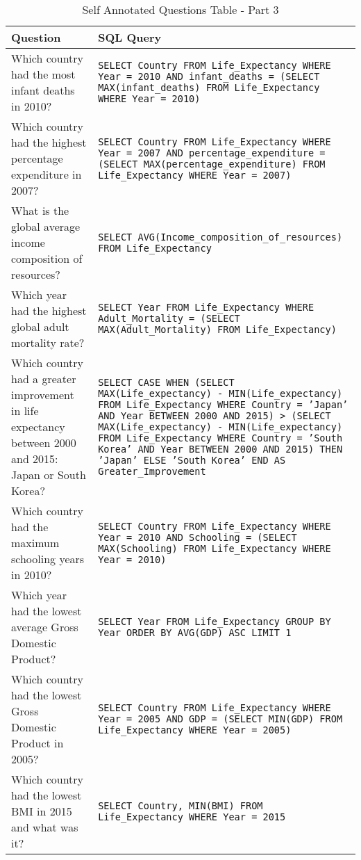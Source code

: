 \documentclass[11pt]{article}
\begin{document}
\begin{table*}[t]
\centering
\begin{tabular}{|p{}|p{}|}
\hline
\textbf{Question} & \textbf{SQL Query} \\
\hline

Which country had the most infant deaths in 2010? & \texttt{SELECT Country FROM Life\_Expectancy WHERE Year = 2010 AND infant\_deaths = (SELECT MAX(infant\_deaths) FROM Life\_Expectancy WHERE Year = 2010)} \\ \hline
Which country had the highest percentage expenditure in 2007? & \texttt{SELECT Country FROM Life\_Expectancy WHERE Year = 2007 AND percentage\_expenditure = (SELECT MAX(percentage\_expenditure) FROM Life\_Expectancy WHERE Year = 2007)} \\ \hline
What is the global average income composition of resources? & \texttt{SELECT AVG(Income\_composition\_of\_resources) FROM Life\_Expectancy} \\ \hline
Which year had the highest global adult mortality rate? & \texttt{SELECT Year FROM Life\_Expectancy WHERE Adult\_Mortality = (SELECT MAX(Adult\_Mortality) FROM Life\_Expectancy)} \\ \hline
Which country had a greater improvement in life expectancy between 2000 and 2015: Japan or South Korea? & \texttt{SELECT CASE WHEN (SELECT MAX(Life\_expectancy) - MIN(Life\_expectancy) FROM Life\_Expectancy WHERE Country = 'Japan' AND Year BETWEEN 2000 AND 2015) > (SELECT MAX(Life\_expectancy) - MIN(Life\_expectancy) FROM Life\_Expectancy WHERE Country = 'South Korea' AND Year BETWEEN 2000 AND 2015) THEN 'Japan' ELSE 'South Korea' END AS Greater\_Improvement} \\ \hline
Which country had the maximum schooling years in 2010? & \texttt{SELECT Country FROM Life\_Expectancy WHERE Year = 2010 AND Schooling = (SELECT MAX(Schooling) FROM Life\_Expectancy WHERE Year = 2010)} \\ \hline
Which year had the lowest average Gross Domestic Product? & \texttt{SELECT Year FROM Life\_Expectancy GROUP BY Year ORDER BY AVG(GDP) ASC LIMIT 1} \\ \hline
Which country had the lowest Gross Domestic Product in 2005? & \texttt{SELECT Country FROM Life\_Expectancy WHERE Year = 2005 AND GDP = (SELECT MIN(GDP) FROM Life\_Expectancy WHERE Year = 2005)} \\ \hline
Which country had the lowest BMI in 2015 and what was it? & \texttt{SELECT Country, MIN(BMI) FROM Life\_Expectancy WHERE Year = 2015} \\ \hline

\end{tabular}
\caption{Self Annotated Questions Table - Part 3}
\label{append:4}
\end{table*}
\end{document}
